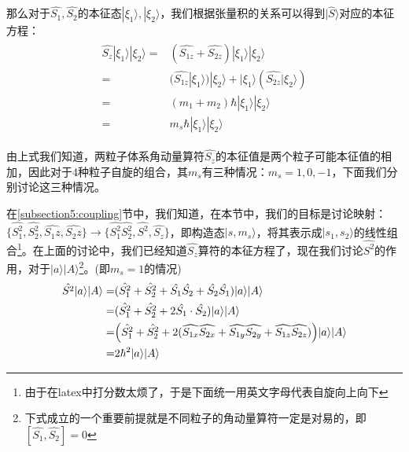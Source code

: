     那么对于$\hat{S_1},\hat{S_2}$的本征态$|\xi_1\rangle,|\xi_2\rangle$，我们根据张量积的关系可以得到$|\hat{S}\rangle$对应的本征方程：
    \begin{align}
        \begin{split}
            \hat{S_z}|\xi_1\rangle|\xi_2\rangle=&(\hat{S_{1z}}+\hat{S_{2z}})|\xi_1\rangle|\xi_2\rangle\\
        =&(\widehat{S_{1z}}|\xi_1\rangle)|\xi_2\rangle+|\xi_1\rangle(\widehat{S_{2z}}|\xi_2\rangle)\\
        =&(m_1+m_2)\hbar|\xi_1\rangle|\xi_2\rangle\\
        =& m_s\hbar|\xi_1\rangle|\xi_2\rangle
        \end{split}
    \end{align}
 
 由上式我们知道，两粒子体系角动量算符$\hat{S_z}$的本征值是两个粒子可能本征值的相加，因此对于4种粒子自旋的组合，其$m_s$有三种情况：$m_s=1,0,-1$，下面我们分别讨论这三种情况。
 
 在\ref{subsection5:coupling}节中，我们知道，在本节中，我们的目标是讨论映射：$\{\widehat{S_1^2},\widehat{S_2^2},\widehat{S_1z},\widehat{S_2z}\}\rightarrow\{\widehat{S_1^2}\widehat{S_2^2},\widehat{S^2},\widehat{S_z}\}$，即构造态$|s,m_s\rangle$，将其表示成$|s_1,s_2\rangle$的线性组合\footnote{由于在latex中打分数太烦了，于是下面统一用英文字母代表自旋向上向下}。在上面的讨论中，我们已经知道$\hat{S_z}$算符的本征方程了，现在我们讨论$\hat{S^2}$的作用，对于$|a\rangle|A\rangle$\footnote{下式成立的一个重要前提就是不同粒子的角动量算符一定是对易的，即$[\hat{S_1},\hat{S_2}]=0$}。(即$m_s=1$的情况) 
 \begin{align}
  \begin{split}
      \hat{S^2}|a\rangle|A\rangle=&(\hat{S_1^2}+\hat{S_2^2}+\hat{S_1}\hat{S_2}+\hat{S_2}\hat{S_1})|a\rangle|A\rangle\\
      =&(\hat{S_1^2}+\hat{S_2^2}+2\hat{S_1}\cdot \hat{S_2})|a\rangle|A\rangle\\ 
      =&\Bigl(\hat{S_1^2}+\hat{S_2^2}+2(\widehat{S_{1x}} \widehat{S_{2x}}+\widehat{S_{1y}} \widehat{S_{2y}}+\widehat{S_{1z}} \widehat{S_{2z}})\Bigr)|a\rangle|A\rangle\\
      =&2\hbar^2|a\rangle|A\rangle
  \end{split} 
 \end{align}

